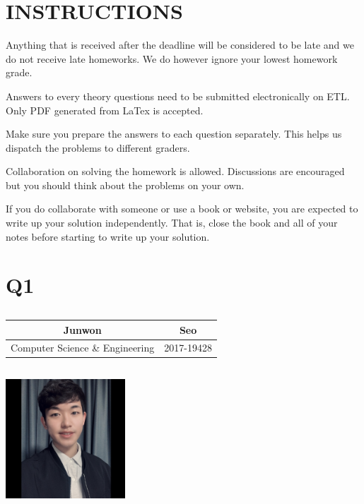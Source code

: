 \documentclass{article}
\begin{document}
\pagestyle{fancy}

\section*{INSTRUCTIONS}

\begin{itemize*}
\item Anything
  that is received after the deadline will be considered to be late and we do not receive late homeworks. We do however ignore your lowest homework grade. 
\item Answers to every theory questions need to be submitted
  electronically on ETL. Only PDF generated from LaTex is accepted.
\item Make sure you prepare the answers to each question
  separately. This helps us dispatch the problems to different graders.
\item Collaboration on solving the homework is allowed. Discussions
  are encouraged but you should think about the problems on your own. 
\item If you do collaborate with someone or use a book or website, you
  are expected to write up your solution independently.  That is,
  close the book and all of your notes before starting to write up
  your solution. 
\end{itemize*}


\section{Q1}

\subsection{}
\begin{center}
    \begin{tabular}{|c | c|}
    \hline
    Junwon & Seo \\
    \hline
    Computer Science \& Engineering & 2017-19428 \\
    \hline
    \end{tabular}
\end{center}

\subsection{}    
\graphicspath{ {images/}}
\begin{center}
    \includegraphics[width=0.335\textwidth]{junwon.jpg}
\end{center}
\end{document}

